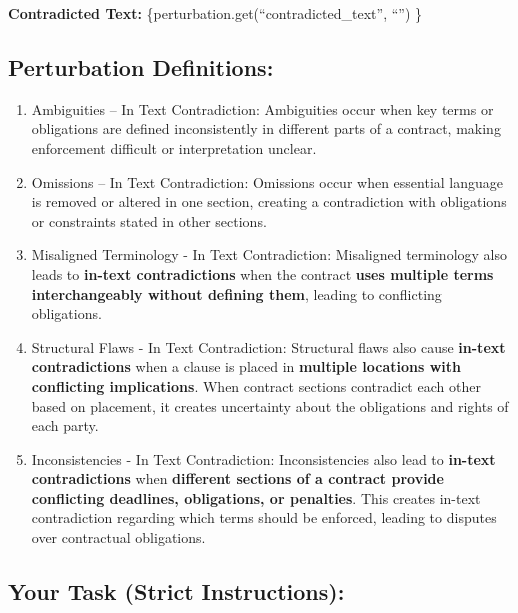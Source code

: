 \documentclass[11pt]{article}
\begin{document}
\begin{tcolorbox}[breakable,colback=lightestgray,colframe=black,title=\textbf{In-Text LLM Validation Prompt}]
\textbf{Contradicted Text:} \{perturbation.get(``contradicted\_text'', ``'') \}

\subsection*{\textbf{Perturbation Definitions:}}
\begin{enumerate}
    \item Ambiguities – In Text Contradiction: Ambiguities occur when key terms or obligations are defined inconsistently in different parts of a contract, making enforcement difficult or interpretation unclear.
    \item Omissions – In Text Contradiction: Omissions occur when essential language is removed or altered in one section, creating a contradiction with obligations or constraints stated in other sections.
    \item Misaligned Terminology - In Text Contradiction: Misaligned terminology also leads to \textbf{in-text contradictions} when the contract \textbf{uses multiple terms interchangeably without defining them}, leading to conflicting obligations.
    \item Structural Flaws - In Text Contradiction: Structural flaws also cause \textbf{in-text contradictions} when a clause is placed in \textbf{multiple locations with conflicting implications}. When contract sections contradict each other based on placement, it creates uncertainty about the obligations and rights of each party.
    \item Inconsistencies - In Text Contradiction: Inconsistencies also lead to \textbf{in-text contradictions} when \textbf{different sections of a contract provide conflicting deadlines, obligations, or penalties}. This creates in-text contradiction regarding which terms should be enforced, leading to disputes over contractual obligations.
\end{enumerate}

\subsection*{\textbf{Your Task (Strict Instructions):}}


\end{tcolorbox}
\end{document}
